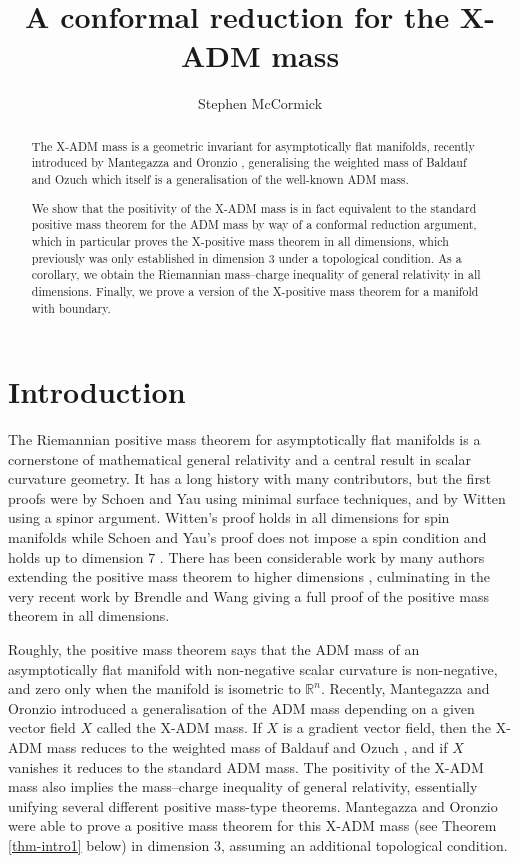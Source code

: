 \documentclass[a4paper,11pt,reqno]{amsart}
\title[]{A conformal reduction for the X-ADM mass}
\author[S. McCormick]{Stephen McCormick}
\theoremstyle{plain}
\theoremstyle{definition}
\theoremstyle{remark}
\newcommand{\R}{\mathbb{R}}
\numberwithin{equation}{section}
\begin{document}
	
	\begin{abstract}		
		 The X-ADM mass is a geometric invariant for asymptotically flat manifolds, recently introduced by Mantegazza and Oronzio \cite{MantegazzaOronzio2026XADM}, generalising the weighted mass of Baldauf and Ozuch \cite{BaldaufOzuch22} which itself is a generalisation of the well-known ADM mass.
		 
		 We show that the positivity of the X-ADM mass is in fact equivalent to the standard positive mass theorem for the ADM mass by way of a conformal reduction argument, which in particular proves the X-positive mass theorem in all dimensions, which previously was only established in dimension $3$ under a topological condition. As a corollary, we obtain the Riemannian mass--charge inequality of general relativity in all dimensions. Finally, we prove a version of the X-positive mass theorem for a manifold with boundary.
 	\end{abstract}
	
	\maketitle
	
\section{Introduction}
The Riemannian positive mass theorem for asymptotically flat manifolds is a cornerstone of mathematical general relativity and a central result in scalar curvature geometry. It has a long history with many contributors, but the first proofs were by Schoen and Yau \cite{SchoenYau1979PositiveMass} using minimal surface techniques, and by Witten \cite{Witten81} using a spinor argument. Witten's proof holds in all dimensions for spin manifolds \cite{Bartnik86} while Schoen and Yau's proof does not impose a spin condition and holds up to dimension $7$ \cite{schoen1979complete}. There has been considerable work by many authors extending the positive mass theorem to higher dimensions \cite{bi2026proof,chodosh2025generic,chodosh2023generic,Lohkamp2006,SchoenYauAllDimensions}, culminating in the very recent work by Brendle and Wang \cite{BrendleWang2026} giving a full proof of the positive mass theorem in all dimensions.


 Roughly, the positive mass theorem says that the ADM mass of an asymptotically flat manifold with non-negative scalar curvature is non-negative, and zero only when the manifold is isometric to $\R^n$. Recently, Mantegazza and Oronzio \cite{MantegazzaOronzio2026XADM} introduced a generalisation of the ADM mass depending on a given vector field $X$ called the X-ADM mass. If $X$ is a gradient vector field, then the X-ADM mass reduces to the weighted mass of Baldauf and Ozuch \cite{BaldaufOzuch22}, and if $X$ vanishes it reduces to the standard ADM mass. The positivity of the X-ADM mass also implies the mass--charge inequality of general relativity, essentially unifying several different positive mass-type theorems. Mantegazza and Oronzio were able to prove a positive mass theorem for this X-ADM mass (see Theorem \ref{thm-intro1} below) in dimension $3$, assuming an additional topological condition.
\end{document}
